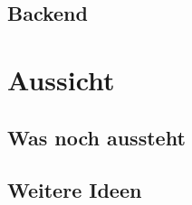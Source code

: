 \documentclass[aspectratio=169]{beamer}
\begin{document}
	\subsection{Backend}
\section{Aussicht}
	\subsection{Was noch aussteht}
	\subsection{Weitere Ideen}


\end{document}
